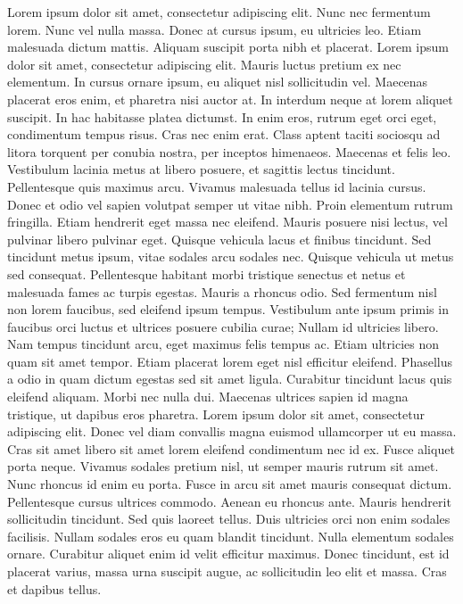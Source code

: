 Lorem ipsum dolor sit amet, consectetur adipiscing elit. Nunc nec fermentum lorem. Nunc vel nulla massa. Donec at cursus ipsum, eu ultricies leo. Etiam malesuada dictum mattis. Aliquam suscipit porta nibh et placerat. Lorem ipsum dolor sit amet, consectetur adipiscing elit. Mauris luctus pretium ex nec elementum. In cursus ornare ipsum, eu aliquet nisl sollicitudin vel. Maecenas placerat eros enim, et pharetra nisi auctor at.
In interdum neque at lorem aliquet suscipit. In hac habitasse platea dictumst. In enim eros, rutrum eget orci eget, condimentum tempus risus. Cras nec enim erat. Class aptent taciti sociosqu ad litora torquent per conubia nostra, per inceptos himenaeos. Maecenas et felis leo. Vestibulum lacinia metus at libero posuere, et sagittis lectus tincidunt. Pellentesque quis maximus arcu. Vivamus malesuada tellus id lacinia cursus. Donec et odio vel sapien volutpat semper ut vitae nibh. Proin elementum rutrum fringilla. Etiam hendrerit eget massa nec eleifend. Mauris posuere nisi lectus, vel pulvinar libero pulvinar eget. Quisque vehicula lacus et finibus tincidunt.
Sed tincidunt metus ipsum, vitae sodales arcu sodales nec. Quisque vehicula ut metus sed consequat. Pellentesque habitant morbi tristique senectus et netus et malesuada fames ac turpis egestas. Mauris a rhoncus odio. Sed fermentum nisl non lorem faucibus, sed eleifend ipsum tempus. Vestibulum ante ipsum primis in faucibus orci luctus et ultrices posuere cubilia curae; Nullam id ultricies libero. Nam tempus tincidunt arcu, eget maximus felis tempus ac. Etiam ultricies non quam sit amet tempor. Etiam placerat lorem eget nisl efficitur eleifend. Phasellus a odio in quam dictum egestas sed sit amet ligula. Curabitur tincidunt lacus quis eleifend aliquam. Morbi nec nulla dui.
Maecenas ultrices sapien id magna tristique, ut dapibus eros pharetra. Lorem ipsum dolor sit amet, consectetur adipiscing elit. Donec vel diam convallis magna euismod ullamcorper ut eu massa. Cras sit amet libero sit amet lorem eleifend condimentum nec id ex. Fusce aliquet porta neque. Vivamus sodales pretium nisl, ut semper mauris rutrum sit amet. Nunc rhoncus id enim eu porta.
Fusce in arcu sit amet mauris consequat dictum. Pellentesque cursus ultrices commodo. Aenean eu rhoncus ante. Mauris hendrerit sollicitudin tincidunt. Sed quis laoreet tellus. Duis ultricies orci non enim sodales facilisis. Nullam sodales eros eu quam blandit tincidunt. Nulla elementum sodales ornare. Curabitur aliquet enim id velit efficitur maximus. Donec tincidunt, est id placerat varius, massa urna suscipit augue, ac sollicitudin leo elit et massa. Cras et dapibus tellus.
